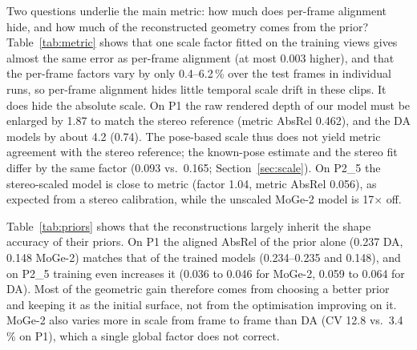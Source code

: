 Two questions underlie the main metric: how much does per-frame alignment hide, and how much of the reconstructed geometry comes from the prior? Table~\ref{tab:metric} shows that one scale factor fitted on the training views gives almost the same error as per-frame alignment (at most 0.003 higher), and that the per-frame factors vary by only 0.4--6.2\,\% over the test frames in individual runs, so per-frame alignment hides little temporal scale drift in these clips. It does hide the absolute scale. On P1 the raw rendered depth of our model must be enlarged by 1.87 to match the stereo reference (metric AbsRel 0.462), and the DA models by about 4.2 (0.74). The pose-based scale thus does not yield metric agreement with the stereo reference; the known-pose estimate and the stereo fit differ by the same factor (0.093 vs.\ 0.165; Section~\ref{sec:scale}). On P2\_5 the stereo-scaled model is close to metric (factor 1.04, metric AbsRel 0.056), as expected from a stereo calibration, while the unscaled MoGe-2 model is 17$\times$ off.

Table~\ref{tab:priors} shows that the reconstructions largely inherit the shape accuracy of their priors. On P1 the aligned AbsRel of the prior alone (0.237 DA, 0.148 MoGe-2) matches that of the trained models (0.234--0.235 and 0.148), and on P2\_5 training even increases it (0.036 to 0.046 for MoGe-2, 0.059 to 0.064 for DA). Most of the geometric gain therefore comes from choosing a better prior and keeping it as the initial surface, not from the optimisation improving on it. MoGe-2 also varies more in scale from frame to frame than DA (CV 12.8 vs.\ 3.4\,\% on P1), which a single global factor does not correct.

